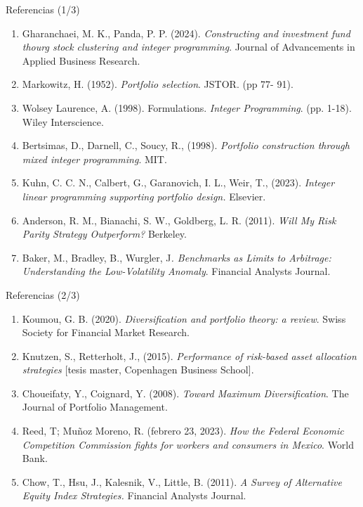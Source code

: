 \documentclass[aspectratio=169,xcolor=dvipsnames]{beamer}
\begin{document}
\begin{frame}{Referencias (1/3)}
    \begin{enumerate}
        \def\labelenumi{\arabic{enumi}.}
        \item
        Gharanchaei, M. K., Panda, P. P. (2024). \emph{Constructing and
        investment fund thourg stock clustering and integer programming}.
        Journal of Advancements in Applied Business Research.
        \item
        Markowitz, H. (1952). \emph{Portfolio selection}. JSTOR. (pp 77- 91).
        \item
        Wolsey Laurence, A. (1998). Formulations. \emph{Integer Programming}.
        (pp. 1-18). Wiley Interscience.
        \item
        Bertsimas, D., Darnell, C., Soucy, R., (1998). \emph{Portfolio construction
        through mixed integer programming}. MIT.
        \item
        Kuhn, C. C. N., Calbert, G., Garanovich, I. L., Weir, T., (2023).
        \emph{Integer linear programming supporting portfolio design.}
        Elsevier.
        \item
        Anderson, R. M., Bianachi, S. W., Goldberg, L. R. (2011). \emph{Will
        My Risk Parity Strategy Outperform?} Berkeley.
        \item
        Baker, M., Bradley, B., Wurgler, J\emph{. Benchmarks as Limits to
        Arbitrage: Understanding the Low-Volatility Anomaly}. Financial
        Analysts Journal.
    \end{enumerate}
\end{frame}

\begin{frame}{Referencias (2/3)}
    \begin{enumerate}
        \item
        Koumou, G. B. (2020). \emph{Diversification and portfolio theory: a
        review}. Swiss Society for Financial Market Research.
        \item
        Knutzen, S., Retterholt, J., (2015). \emph{Performance of risk-based
        asset allocation strategies} {[}tesis master, Copenhagen Business
        School{]}.
        \item
        Choueifaty, Y., Coignard, Y. (2008). \emph{Toward Maximum
        Diversification}. The Journal of Portfolio Management.
        \item
        Reed, T; Muñoz Moreno, R. (febrero 23, 2023). \emph{How the Federal Economic
        Competition Commission fights for workers and consumers in Mexico}.
        World Bank.
        \item
        Chow, T., Hsu, J., Kalesnik, V., Little, B. (2011). \emph{A Survey of
        Alternative Equity Index Strategies.} Financial Analysts Journal.
\end{enumerate}
\end{frame}
\end{document}
